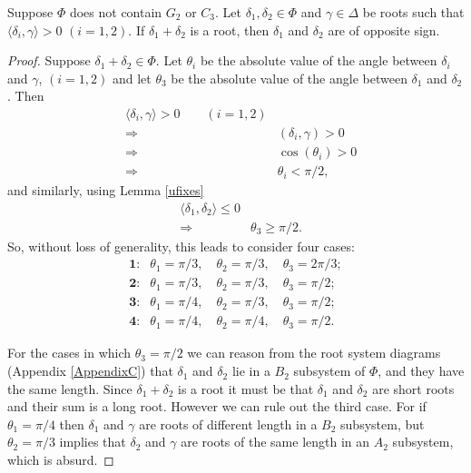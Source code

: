 \begin{lemma} \label{uabelian}
Suppose $\Phi$ does not contain $G_2$ or $C_3$. Let $\delta_1, \delta_2 \in \Phi$ and $\gamma \in \Delta$ be roots such that $\langle \delta_i, \gamma \rangle > 0$ $(i = 1, 2)$. If $\delta_1 + \delta_2$ is a root, then $\delta_1$ and $\delta_2$ are of opposite sign.
\end{lemma}
\begin{proof}
Suppose $\delta_1 + \delta_2 \in \Phi$. Let $\theta_i$ be the absolute value of the angle between $\delta_i$ and $\gamma$, $(i = 1,2)$ and let $\theta_3$ be the absolute value of the angle between $\delta_1$ and $\delta_2$. Then
\begin{align*}
& \langle \delta_i, \gamma\rangle > 0 \qquad (i=1,2) \\
& \Longrightarrow& (\delta_i, \gamma) > 0 \\
& \Longrightarrow& \cos(\theta_i) > 0 \\
& \Longrightarrow& \theta_i < \pi/2,
\end{align*}
and similarly, using Lemma \ref{ufixes}
\begin{align*}
& \langle \delta_1, \delta_2 \rangle \leq 0 \\
& \Longrightarrow& \theta_3 \geq \pi/2.
\end{align*}
So, without loss of generality, this leads to consider four cases:
\begin{align*}
\textbf{1:}&\theta_1 = \pi/3,\quad\theta_2 = \pi/3,\quad\theta_3 = 2\pi/3; \\
\textbf{2:}&\theta_1 = \pi/3,\quad\theta_2 = \pi/3,\quad\theta_3 = \pi/2; \\
\textbf{3:}&\theta_1 = \pi/4,\quad\theta_2 = \pi/3,\quad\theta_3 = \pi/2; \\
\textbf{4:}&\theta_1 = \pi/4,\quad\theta_2 = \pi/4,\quad\theta_3 = \pi/2.
\end{align*}

For the cases in which $\theta_3 = \pi/2$ we can reason from the root system diagrams (Appendix \ref{AppendixC}) that $\delta_1$ and $\delta_2$ lie in a $B_2$ subsystem of $\Phi$, and they have the same length. Since $\delta_1+\delta_2$ is a root it must be that $\delta_1$ and $\delta_2$ are short roots and their sum is a long root. However we can rule out the third case. For if $\theta_1 = \pi/4$ then $\delta_1$ and $\gamma$ are roots of different length in a $B_2$ subsystem, but $\theta_2 = \pi/3$ implies that $\delta_2$ and $\gamma$ are roots of the same length in an $A_2$ subsystem, which is absurd.


\end{proof}
